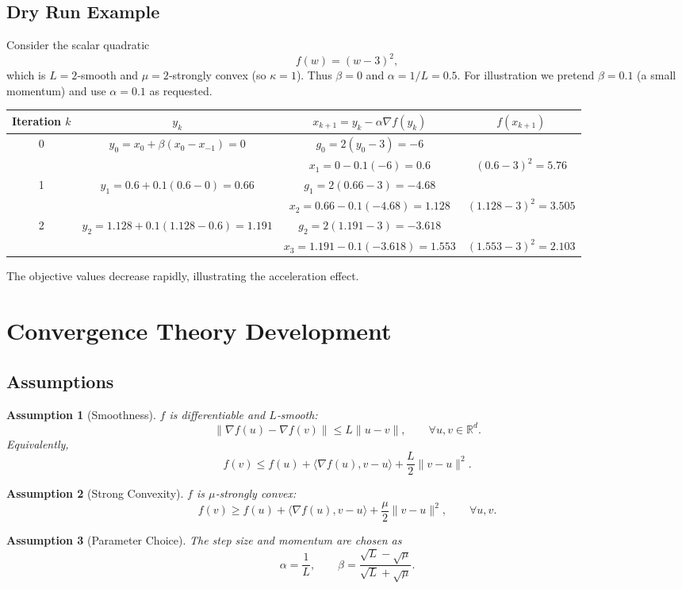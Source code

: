 \documentclass[11pt]{article}
\newtheorem{assumption}{Assumption}[section]
\begin{document}
\subsection*{Dry Run Example}
Consider the scalar quadratic
\[
    f(w) = (w-3)^2,
\]
which is $L=2$‑smooth and $\mu=2$‑strongly convex (so $\kappa=1$).  
Thus $\beta = 0$ and $\alpha = 1/L = 0.5$.  
For illustration we pretend $\beta=0.1$ (a small momentum) and use $\alpha=0.1$ as requested.

\begin{center}
\begin{tabular}{c|c|c|c}
Iteration $k$ & $y_k$ & $x_{k+1}=y_k-\alpha\nabla f(y_k)$ & $f(x_{k+1})$\\ \hline
0 & $y_0 = x_0 +\beta (x_0-x_{-1}) = 0$ & $g_0=2(y_0-3)=-6$\\
  & & $x_1 = 0 -0.1(-6)=0.6$ & $(0.6-3)^2=5.76$ \\ \hline
1 & $y_1 = 0.6 +0.1(0.6-0)=0.66$ & $g_1=2(0.66-3)=-4.68$\\
  & & $x_2 = 0.66 -0.1(-4.68)=1.128$ & $(1.128-3)^2=3.505$ \\ \hline
2 & $y_2 = 1.128 +0.1(1.128-0.6)=1.191$ & $g_2=2(1.191-3)=-3.618$\\
  & & $x_3 = 1.191 -0.1(-3.618)=1.553$ & $(1.553-3)^2=2.103$ 
\end{tabular}
\end{center}
The objective values decrease rapidly, illustrating the acceleration effect.

\section*{Convergence Theory Development}

\subsection*{Assumptions}
\begin{assumption}[Smoothness]\label{ass:smooth}
$f$ is differentiable and $L$‑smooth:
\[
    \|\nabla f(u)-\nabla f(v)\|\le L\|u-v\|,\qquad\forall u,v\in\mathbb{R}^d.
\]
Equivalently,
\[
    f(v)\le f(u)+\langle\nabla f(u),v-u\rangle+\frac{L}{2}\|v-u\|^2.
\]
\end{assumption}
\begin{assumption}[Strong Convexity]\label{ass:strong}
$f$ is $\mu$‑strongly convex:
\[
    f(v)\ge f(u)+\langle\nabla f(u),v-u\rangle+\frac{\mu}{2}\|v-u\|^2,\qquad\forall u,v.
\]
\end{assumption}
\begin{assumption}[Parameter Choice]\label{ass:param}
The step size and momentum are chosen as
\[
    \alpha = \frac{1}{L},\qquad
    \beta = \frac{\sqrt{L}-\sqrt{\mu}}{\sqrt{L}+\sqrt{\mu}}.
\]
\end{assumption}
\end{document}
